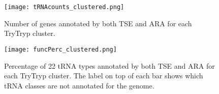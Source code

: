 \documentclass[
10pt, %
a4paper, %
oneside, %
headinclude,footinclude, %
BCOR5mm, %
]{scrartcl}
\begin{document}
\begin{figure}[tb]
\centering 
\texttt{[image: tRNAcounts\_clustered.png]} 
\caption[Number of Genes annotated]{Number of genes annotated by both TSE and ARA for each TryTryp cluster.}
\label{fig:countsclustered} 
\end{figure}

\begin{figure}[tb]
\centering 
\texttt{[image: funcPerc\_clustered.png]} 
\caption[Genome Comparison]{Percentage of 22 tRNA types annotated by both TSE and ARA for each TryTryp cluster. The label on top of each bar shows which tRNA classes are not annotated for the genome.} 
\label{fig:funcclustered} 
\end{figure}
\newpage
\renewcommand{\refname}{\spacedlowsmallcaps{References}} %




\end{document}
